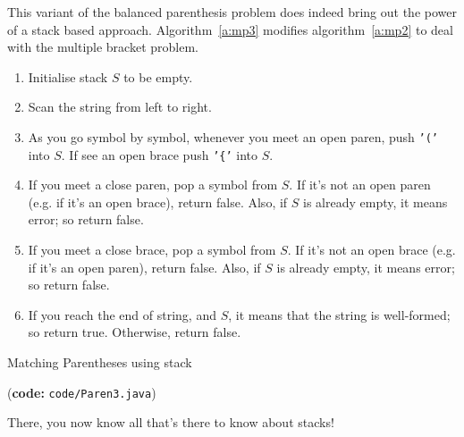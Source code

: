 \documentclass[12pt,a4paper]{article}
\begin{document}
This variant of the balanced parenthesis problem does indeed bring out the power of a stack based approach. Algorithm~\ref{a:mp3} modifies algorithm~\ref{a:mp2} to deal with the multiple bracket problem.


\begin{algorithm}
\begin{enumerate}
\item Initialise stack $S$ to be empty.
\item Scan the string from left to right.
\item As you go symbol by symbol, whenever you meet an open paren, push \texttt{'('} into $S$. If see an open brace push \texttt{'\{'} into $S$.
\item If you meet a close paren, pop a symbol from $S$. If it's not an open paren (e.g. if it's an open brace), return false. Also, if $S$ is already empty, it means error; so return false.
\item If you meet a close brace, pop a symbol from $S$. If it's not an open brace (e.g. if it's an open paren), return false. Also, if $S$ is already empty, it means error; so return false.
\item If you reach the end of string, and $S$, it means that the string is well-formed; so return true. Otherwise, return false. 
\end{enumerate}
\caption{Matching Parentheses using stack}
\label{a:mp3}
\end{algorithm}

(\textbf{code:} \texttt{code/Paren3.java})

There, you now know all that's there to know about stacks!
\end{document}
